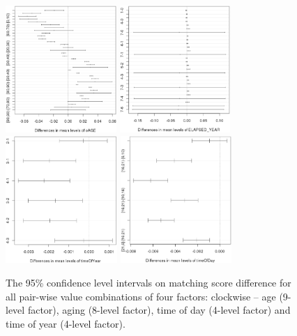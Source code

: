 \documentclass{cta-author}%
\begin{document}
\begin{figure} [!t] \centering
\includegraphics[width=0.5\linewidth,height=1.9in]{eps/PortG-aov-HDNORM=f(AGE,ELAPSE,yd,hh)-1-AGE-c.eps}%
\includegraphics[width=0.5\linewidth,height=1.9in]{eps/PortG-aov-HDNORM=f(AGE,ELAPSE,yd,hh)-2ELAPSE-c.eps}\\
\includegraphics[width=0.5\linewidth,height=1.9in]{eps/PortG-aov-HDNORM=f(AGE,ELAPSE,yd,hh)-3Yd-c}%
\includegraphics[width=0.5\linewidth,height=1.9in]{eps/PortG-aov-HDNORM=f(AGE,ELAPSE,yd,hh)-4-hh-c}

\caption{
The 95\%  confidence level intervals on matching score difference for all pair-wise value combinations of four factors:  clockwise --  age (9-level factor), aging (8-level factor), time of day (4-level factor) and time of year (4-level factor). %
}

\label{fAOVplots}

\end{figure}
\end{document}

